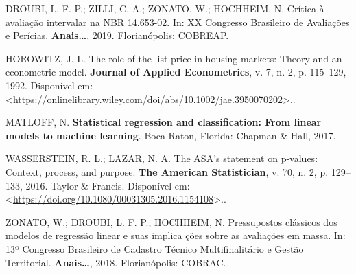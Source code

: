 \documentclass[
  a4paper, 11pt]{article}
\begin{document}
\leavevmode\hypertarget{ref-droubi2019}{}%
DROUBI, L. F. P.; ZILLI, C. A.; ZONATO, W.; HOCHHEIM, N. Crítica à
avaliação intervalar na NBR 14.653-02. In: XX Congresso Brasileiro de
Avaliações e Perícias. \textbf{Anais\ldots{}}, 2019. Florianópolis:
COBREAP.

\leavevmode\hypertarget{ref-horowitz}{}%
HOROWITZ, J. L. The role of the list price in housing markets: Theory
and an econometric model. \textbf{Journal of Applied Econometrics}, v.
7, n. 2, p. 115--129, 1992. Disponível em:
\textless{}\url{https://onlinelibrary.wiley.com/doi/abs/10.1002/jae.3950070202}\textgreater..

\leavevmode\hypertarget{ref-matloff2017}{}%
MATLOFF, N. \textbf{Statistical regression and classification: From
linear models to machine learning}. Boca Raton, Florida: Chapman \&
Hall, 2017.

\leavevmode\hypertarget{ref-ASA}{}%
WASSERSTEIN, R. L.; LAZAR, N. A. The ASA's statement on p-values:
Context, process, and purpose. \textbf{The American Statistician}, v.
70, n. 2, p. 129--133, 2016. Taylor \& Francis. Disponível em:
\textless{}\url{https://doi.org/10.1080/00031305.2016.1154108}\textgreater..

\leavevmode\hypertarget{ref-zonato2018}{}%
ZONATO, W.; DROUBI, L. F. P.; HOCHHEIM, N. Pressupostos clássicos dos
modelos de regressão linear e suas implica ções sobre as avaliações em
massa. In: 13º Congresso Brasileiro de Cadastro Técnico Multifinalitário
e Gestão Territorial. \textbf{Anais\ldots{}}, 2018. Florianópolis:
COBRAC.
\end{document}
